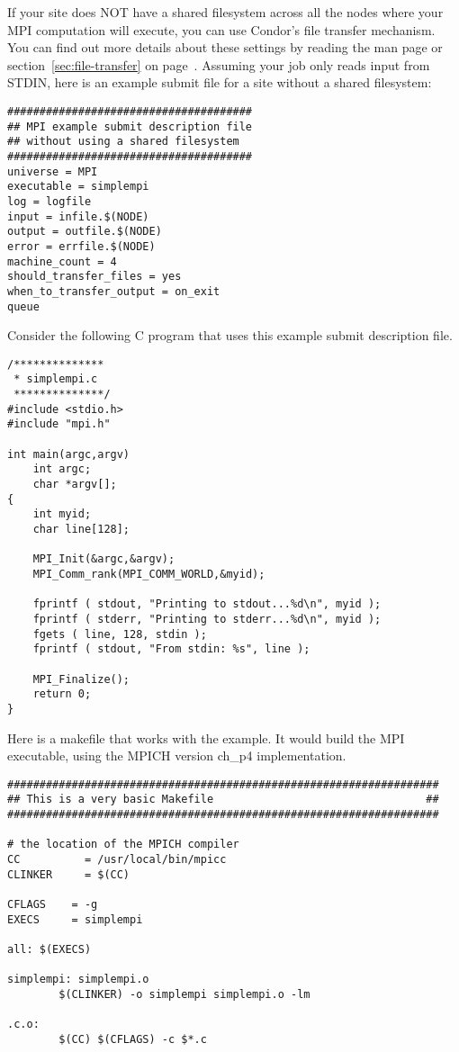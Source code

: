 If your site does NOT have a shared filesystem across all the nodes
where your MPI computation will execute, you can use Condor's file
transfer mechanism.
You can find out more details about these settings by reading the
 man page or section~\ref{sec:file-transfer} on
page~\pageref{sec:file-transfer}. 
Assuming your job only reads input from STDIN, here is an example
submit file for a site without a shared filesystem:

\begin{verbatim}
######################################
## MPI example submit description file
## without using a shared filesystem
######################################
universe = MPI
executable = simplempi
log = logfile
input = infile.$(NODE)
output = outfile.$(NODE)
error = errfile.$(NODE)
machine_count = 4
should_transfer_files = yes
when_to_transfer_output = on_exit
queue
\end{verbatim}

Consider the following C program that uses this example submit
description file.

\begin{verbatim}
/**************
 * simplempi.c
 **************/
#include <stdio.h>
#include "mpi.h"

int main(argc,argv)
    int argc;
    char *argv[];
{
    int myid;
    char line[128];

    MPI_Init(&argc,&argv);
    MPI_Comm_rank(MPI_COMM_WORLD,&myid);

    fprintf ( stdout, "Printing to stdout...%d\n", myid );
    fprintf ( stderr, "Printing to stderr...%d\n", myid );
    fgets ( line, 128, stdin );
    fprintf ( stdout, "From stdin: %s", line );

    MPI_Finalize();
    return 0;
}
\end{verbatim}

Here is a makefile that works with the example.
It would build the MPI executable, using the MPICH
version ch\_p4 implementation.
\begin{verbatim}
###################################################################
## This is a very basic Makefile                                 ##
###################################################################

# the location of the MPICH compiler
CC          = /usr/local/bin/mpicc
CLINKER     = $(CC)

CFLAGS    = -g
EXECS     = simplempi

all: $(EXECS)

simplempi: simplempi.o
        $(CLINKER) -o simplempi simplempi.o -lm

.c.o:
        $(CC) $(CFLAGS) -c $*.c
\end{verbatim}

